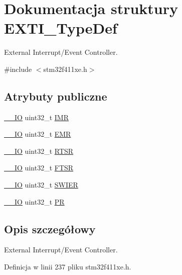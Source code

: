 \hypertarget{struct_e_x_t_i___type_def}{}\section{Dokumentacja struktury E\+X\+T\+I\+\_\+\+Type\+Def}
\label{struct_e_x_t_i___type_def}


External Interrupt/\+Event Controller.  




{\ttfamily \#include $<$stm32f411xe.\+h$>$}

\subsection*{Atrybuty publiczne}
\begin{DoxyCompactItemize}
\item 
\hyperlink{core__sc300_8h_aec43007d9998a0a0e01faede4133d6be}{\+\_\+\+\_\+\+IO} uint32\+\_\+t \hyperlink{struct_e_x_t_i___type_def_a17d061db586d4a5aa646b68495a8e6a4}{I\+MR}
\item 
\hyperlink{core__sc300_8h_aec43007d9998a0a0e01faede4133d6be}{\+\_\+\+\_\+\+IO} uint32\+\_\+t \hyperlink{struct_e_x_t_i___type_def_a9c5bff67bf9499933959df7eb91a1bd6}{E\+MR}
\item 
\hyperlink{core__sc300_8h_aec43007d9998a0a0e01faede4133d6be}{\+\_\+\+\_\+\+IO} uint32\+\_\+t \hyperlink{struct_e_x_t_i___type_def_ac019d211d8c880b327a1b90a06cc0675}{R\+T\+SR}
\item 
\hyperlink{core__sc300_8h_aec43007d9998a0a0e01faede4133d6be}{\+\_\+\+\_\+\+IO} uint32\+\_\+t \hyperlink{struct_e_x_t_i___type_def_aee667dc148250bbf37fdc66dc4a9874d}{F\+T\+SR}
\item 
\hyperlink{core__sc300_8h_aec43007d9998a0a0e01faede4133d6be}{\+\_\+\+\_\+\+IO} uint32\+\_\+t \hyperlink{struct_e_x_t_i___type_def_a5c1f538e64ee90918cd158b808f5d4de}{S\+W\+I\+ER}
\item 
\hyperlink{core__sc300_8h_aec43007d9998a0a0e01faede4133d6be}{\+\_\+\+\_\+\+IO} uint32\+\_\+t \hyperlink{struct_e_x_t_i___type_def_a133294b87dbe6a01e8d9584338abc39a}{PR}
\end{DoxyCompactItemize}


\subsection{Opis szczegółowy}
External Interrupt/\+Event Controller. 

Definicja w linii 237 pliku stm32f411xe.\+h.



